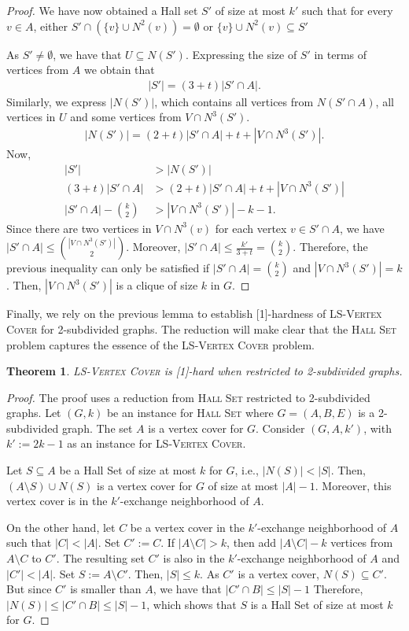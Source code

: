 \documentclass[10pt,usletter]{article}
\newcommand{\W}[1][xxxx]{\text{\normalfont W}[#1]}
\newcommand{\LSVC}{\textsc{LS-Vertex Cover}\xspace}
\newcommand{\HS}{\textsc{Hall Set}\xspace}
\newtheorem{theorem}{Theorem}
\begin{document}
\begin{proof}
We have now obtained a Hall set $S'$ of size at most $k'$ such that for every $v\in A$, either $S' \cap (\{v\}\cup N^2(v)) = \emptyset$
or $\{v\}\cup N^2(v) \subseteq S'$

As $S' \neq \emptyset$, we have that $U \subseteq N(S')$.
Expressing the size of $S'$ in terms of vertices from $A$ we obtain that
\begin{align*}
|S'|=(3+t) |S'\cap A|.
\end{align*}
Similarly, we express $|N(S')|$, which contains all vertices from $N(S'\cap A)$, all vertices in $U$ and some vertices from $V\cap N^3(S')$.
\begin{align*}
|N(S')| = (2+t) |S'\cap A| + t + |V\cap N^3(S')|.
\end{align*}
Now,
\begin{align*}
|S'| &> |N(S')|\\
(3+t) |S'\cap A| &> (2+t) |S'\cap A| + t + |V\cap N^3(S')|\\
|S'\cap A| - \binom{k}{2} &> |V\cap N^3(S')|-k-1.
\end{align*}
Since there are two vertices in $V\cap N^3(v)$ for each vertex $v\in S'\cap A$, we have $|S'\cap A| \le \binom{|V\cap N^3(S')|}{2}$.
Moreover, $|S'\cap A|\le \frac{k'}{3+t} = \binom{k}{2}$.
Therefore, the previous inequality can only be satisfied if $|S'\cap A| = \binom{k}{2}$ and $|V\cap N^3(S')|=k$.
Then, $|V\cap N^3(S')|$ is a clique of size $k$ in $G$.
\end{proof}

Finally, we rely on the previous lemma to establish
\W [1]-hardness of \LSVC for 2-subdivided graphs.
The reduction will make clear that the \HS problem captures
the essence of the \LSVC problem.

\begin{theorem}\label{thm:hardnessVC}
 \LSVC is {\rm \W[1]}-hard when restricted to 2-subdivided graphs.
\end{theorem}
\begin{proof}
The proof uses a reduction from \HS restricted to 2-subdivided graphs.
Let $(G,k)$ be an instance for \HS where $G=(A,B,E)$ is a 2-subdivided graph.
The set $A$ is a vertex cover for $G$. Consider $(G,A,k')$, with $k':=2k-1$ as an instance for \LSVC.

Let $S \subseteq A$ be a Hall Set of size at most $k$ for $G$, i.e., $|N(S)|<|S|$. Then, $(A \setminus S) \cup N(S)$ is
a vertex cover for $G$ of size at most $|A|-1$. Moreover, this vertex cover is in the $k'$-exchange neighborhood of
$A$.

On the other hand, let $C$ be a vertex cover in the $k'$-exchange neighborhood of $A$ such that $|C|<|A|$.
Set $C':=C$.
If $|A \setminus C| > k$, then add $|A \setminus C| - k$ vertices from $A\setminus C$ to $C'$. The resulting set $C'$ is also
in the $k'$-exchange neighborhood of $A$ and $|C'|<|A|$. Set $S:=A\setminus C'$. Then, $|S|\le k$.
As $C'$ is a vertex cover, $N(S) \subseteq C'$. But since $C'$ is smaller than $A$, we have that $|C'\cap B|\le |S|-1$
Therefore, $|N(S)|\le |C'\cap B|\le |S|-1$, which shows that $S$ is a Hall Set of size at most $k$ for $G$.
\end{proof}
\end{document}
